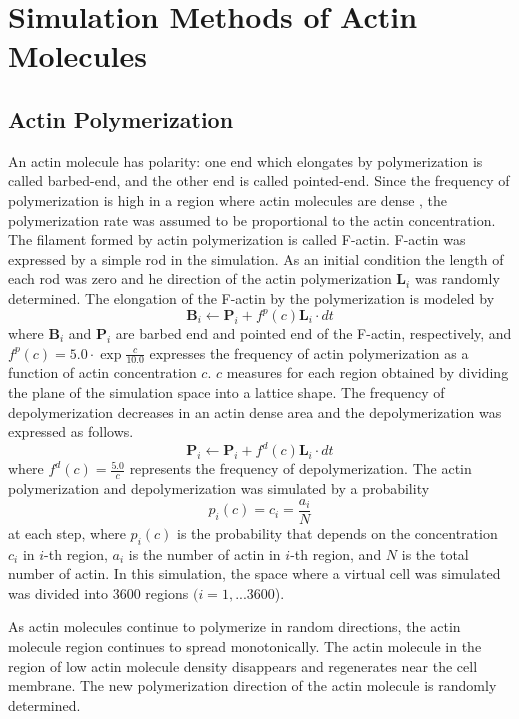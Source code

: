 \documentclass[a4paper,12pt, oneside]{book}
\begin{document}
\section{Simulation Methods of Actin Molecules}
\subsection{Actin Polymerization}
An actin molecule has polarity: one end which elongates by  polymerization is called barbed-end, and the other end is called pointed-end.
Since the frequency of polymerization is high in a region where actin molecules are dense \cite{yumura1998spatiotemporal}, the polymerization rate was assumed to be  proportional to the actin concentration.
The filament formed by actin polymerization is called F-actin.
F-actin was expressed by a simple  rod in the simulation. 
As an initial condition the length of each rod was zero and he direction of the actin polymerization $\bm{L}_i$ was  randomly determined.
The elongation of the F-actin by the polymerization is modeled by
\begin{equation}
\bm{B}_i \gets \bm{P}_i + f^p(c)\bm{L}_i \cdot dt
\end{equation}
where $\bm{B}_i$ and $\bm{P}_i$ are barbed end and pointed end of the F-actin, respectively, and $f^p(c) = 5.0 \cdot \exp{\frac{c}{10.0}}$ expresses the frequency of actin polymerization as a function of actin concentration $c$.
$c$ measures for each region obtained by dividing the plane of the simulation space into a lattice shape.
The frequency of depolymerization decreases in an actin dense area and the depolymerization was expressed  as follows.
\begin{equation}
\bm{P}_i \gets \bm{P}_i + f^d(c)\bm{L}_i \cdot dt
\end{equation}
where $f^d(c) = \frac{5.0}{c}$ represents the frequency of depolymerization. 
The actin polymerization and depolymerization was simulated by a probability  \[p_i(c) = c_i = \frac{a_i}{N}\] at each step, where $p_i(c)$ is the probability that depends on the concentration $c_i$ in $i$-th region, $a_i$ is the number of actin in $i$-th region, and $N$ is the total number of actin.
In this simulation, the space where a virtual cell was simulated was divided into $3600$ regions $(i = 1,...3600$).

As actin molecules continue to polymerize in random directions, the actin molecule region continues to spread monotonically.
The actin molecule in the region of low actin molecule density disappears and regenerates near the cell membrane.
The new polymerization direction of the actin molecule is randomly determined.
\end{document}
